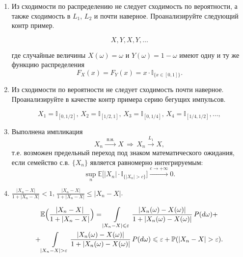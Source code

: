\begin{ordre}
$ $
\begin{enumerate}

\item Из сходимости по распределению не следует сходимость по вероятности, а также сходимость в $L_1$, $L_2$ и почти наверное. Проанализируйте следующий контр пример.  

\[
X,Y,X,Y,\ldots
\]

 где  случайные величины $X(\omega)=\omega$ и $Y(\omega)=1-\omega$ имеют одну и ту же функцию распределения 
$$
F_X(x)=F_Y(x)=x\cdot {\mathbb I}_{\{ x\in[0,1]\}} . 
$$

\item Из сходимости по вероятности не следует сходимость почти наверное. Проанализируйте в качестве контр примера серию бегущих импульсов.
 
$$
X_1={\mathbb I}_{[0,1/2]},\, X_2={\mathbb I}_{[1/2,1]},\, X_3={\mathbb I}_{[0,1/4]},\, X_4={\mathbb I}_{[1/4,1/2]}, \ldots, 
$$

\item Выполнена импликация 
$$
X_n\xrightarrow{\text{ п.н. }}X  \, \Rightarrow\, X_n\xrightarrow{L_1}X , 
$$
т.е. возможен предельный переход под знаком математического ожидания, если семейство с.в. $\{ X_n\}$ является равномерно интегрируемым: 
$$
\sup\limits_n {\mathbb E}\bigl[ |X_n|\cdot {\mathbb I}_{\{ |X_n|>c\}} \bigr]\xrightarrow{c\to +\infty}0 . 
$$

\item 


$\frac{|X_n-X|}{1+|X_n-X|}<1$, $\frac{|X_n-X|}{1+|X_n-X|}\leqslant |X_n-X|$. 


\begin{multline*}
{\mathbb E}\Bigl( \frac{|X_n-X|}{1+|X_n-X|}\Bigr)=\int\limits_{|X_n-X|\leqslant\varepsilon} 
\frac{|X_n(\omega)-X(\omega)|}{1+|X_n(\omega)-X(\omega)|}\, P(d\omega)+\\
+\int\limits_{|X_n-X|>\varepsilon}
\frac{|X_n(\omega)-X(\omega)|}{1+|X_n(\omega)-X(\omega)|}\, P(d\omega)
\leqslant \varepsilon+{\mathbb P}(|X_n-X|>\varepsilon) . 
\end{multline*}

\end{enumerate}

\end{ordre}

